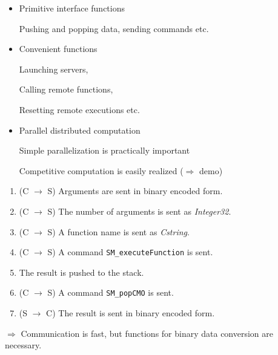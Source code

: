 \begin{slide}{}

\begin{itemize}
\item Primitive interface functions

Pushing and popping data, sending commands etc.

\item Convenient functions

Launching servers,

Calling remote functions,

Resetting remote executions etc.

\item Parallel distributed computation

Simple parallelization is practically important

Competitive computation is easily realized ($\Rightarrow$ demo)
\end{itemize}
\end{slide}

\begin{slide}{}

\begin{enumerate}
\item (C $\rightarrow$ S) Arguments are sent in binary encoded form.
\item (C $\rightarrow$ S) The number of arguments is sent as {\sl Integer32}.
\item (C $\rightarrow$ S) A function name is sent as {\sl Cstring}.
\item (C $\rightarrow$ S) A command {\tt SM\_executeFunction} is sent.
\item The result is pushed to the stack.
\item (C $\rightarrow$ S) A command {\tt SM\_popCMO} is sent.
\item (S $\rightarrow$ C) The result is sent in binary encoded form.
\end{enumerate}

$\Rightarrow$ Communication is fast, but functions for binary data
conversion are necessary.
\end{slide}

